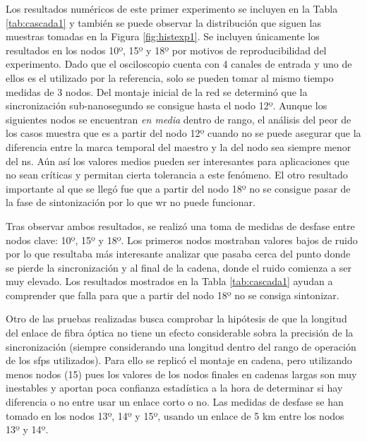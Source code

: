 Los resultados numéricos de este primer experimento se incluyen en la Tabla 
\ref{tab:cascada1} y también se puede observar la distribución que siguen las 
muestras tomadas en la Figura \ref{fig:histexp1}. Se incluyen únicamente los 
resultados en los nodos 10º, 15º y 18º por motivos de reproducibilidad del 
experimento. Dado que el osciloscopio cuenta con 4 canales de entrada y uno de 
ellos es el utilizado por la referencia, solo se pueden tomar al mismo tiempo 
medidas de 3 nodos.
Del montaje inicial de la red se determinó que la sincronización 
sub-nanosegundo se consigue hasta el nodo 12º. Aunque los siguientes nodos se 
encuentran \textit{en media} dentro de rango, el análisis del peor de los casos 
muestra que es a partir del nodo 12º cuando no se puede asegurar que la 
diferencia entre la marca temporal del maestro y la del nodo sea siempre menor 
del ns. Aún así los valores medios pueden ser interesantes para aplicaciones 
que no sean críticas y permitan cierta tolerancia a este fenómeno.
El otro resultado importante al que se llegó fue que a partir del nodo 18º no 
se consigue pasar de la fase de sintonización por lo que \gls{wr} no puede 
funcionar.

Tras observar ambos resultados, se realizó una toma de medidas de desfase entre 
nodos clave: 10º, 15º y 18º. Los primeros nodos mostraban valores bajos de 
ruido por lo que resultaba más interesante analizar que pasaba cerca del punto 
donde se pierde la sincronización y al final de la cadena, donde el ruido 
comienza a ser muy elevado. Los resultados mostrados en la Tabla 
\ref{tab:cascada1} ayudan a comprender que falla para que a partir del nodo 18º 
no se consiga sintonizar. 


Otro de las pruebas realizadas busca comprobar la hipótesis de que la longitud 
del enlace de fibra óptica no tiene un efecto considerable sobra la precisión 
de la sincronización (siempre considerando una longitud dentro del rango de 
operación de los \gls{sfp}s utilizados). Para ello se replicó el montaje en 
cadena, pero utilizando menos nodos (15) pues los valores de los nodos finales 
en cadenas largas son muy inestables y aportan poca confianza estadística a la 
hora de determinar si hay diferencia o no entre usar un enlace corto o no. Las 
medidas de desfase se han tomado en los nodos 13º, 14º y 15º, usando un enlace 
de 5 km entre los nodos 13º y 14º.


